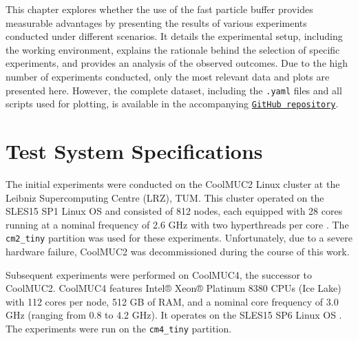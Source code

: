 

This chapter explores whether the use of the fast particle buffer provides measurable advantages by presenting the results of various experiments conducted under different scenarios. It details the experimental setup, including the working environment, explains the rationale behind the selection of specific experiments, and provides an analysis of the observed outcomes. Due to the high number of experiments conducted, only the most relevant data and plots are presented here. However, the complete dataset, including the \texttt{.yaml} files and all scripts used for plotting, is available in the accompanying \href{https://github.com/xhulia028/GraphView}{\texttt{GitHub repository}}.

\section{Test System Specifications}

The initial experiments were conducted on the CoolMUC2 Linux cluster at the Leibniz Supercomputing Centre (LRZ), TUM. This cluster operated on the SLES15 SP1 Linux OS and consisted of 812 nodes, each equipped with 28 cores running at a nominal frequency of 2.6 GHz with two hyperthreads per core \parencite{coolmuc2}. The \texttt{cm2\_tiny} partition was used for these experiments. Unfortunately, due to a severe hardware failure, CoolMUC2 was decommissioned during the course of this work.

Subsequent experiments were performed on CoolMUC4, the successor to CoolMUC2. CoolMUC4 features Intel® Xeon® Platinum 8380 CPUs (Ice Lake) with 112 cores per node, 512 GB of RAM, and a nominal core frequency of 3.0 GHz (ranging from 0.8 to 4.2 GHz). It operates on the SLES15 SP6 Linux OS \parencite{coolmuc4}. The experiments were run on the \texttt{cm4\_tiny} partition.

